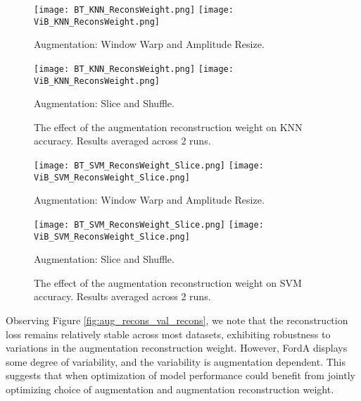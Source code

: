 \documentclass[../../thesis.tex]{subfiles}
\begin{document}
\begin{figure}[H]
    \centering
    \begin{minipage}[b]{\textwidth}
        \centering
        \texttt{[image: BT\_KNN\_ReconsWeight.png]}
        \texttt{[image: ViB\_KNN\_ReconsWeight.png]}
    \end{minipage}
    \caption*{Augmentation: Window Warp and Amplitude Resize.}
    \begin{minipage}[b]{\textwidth}
        \centering
        \texttt{[image: BT\_KNN\_ReconsWeight.png]}
        \texttt{[image: ViB\_KNN\_ReconsWeight.png]}
    \end{minipage}
    \caption*{Augmentation: Slice and Shuffle.}
    \caption{The effect of the augmentation reconstruction weight on KNN accuracy. Results averaged across 2 runs.}
    \label{fig:aug_recons_KNN}
\end{figure}


\begin{figure}[H]
    \centering
    \begin{minipage}[b]{\textwidth}
        \centering
        \texttt{[image: BT\_SVM\_ReconsWeight\_Slice.png]}
        \texttt{[image: ViB\_SVM\_ReconsWeight\_Slice.png]}
    \end{minipage}
    \caption*{Augmentation: Window Warp and Amplitude Resize.}
    \begin{minipage}[b]{\textwidth}
        \centering
        \texttt{[image: BT\_SVM\_ReconsWeight\_Slice.png]}
        \texttt{[image: ViB\_SVM\_ReconsWeight\_Slice.png]}
    \end{minipage}
    \caption*{Augmentation: Slice and Shuffle.}
    \caption{The effect of the augmentation reconstruction weight on SVM accuracy. Results averaged across 2 runs.}
    \label{fig:aug_recons_SVM}

\end{figure}

Observing Figure  \ref{fig:aug_recons_val_recons}, we note that the reconstruction loss remains relatively stable across most datasets, exhibiting robustness to variations in the augmentation reconstruction weight. However, FordA displays some degree of variability, and the variability is augmentation dependent. This suggests that when optimization of model performance could benefit from jointly optimizing choice of augmentation and augmentation reconstruction weight. \newline
\end{document}
